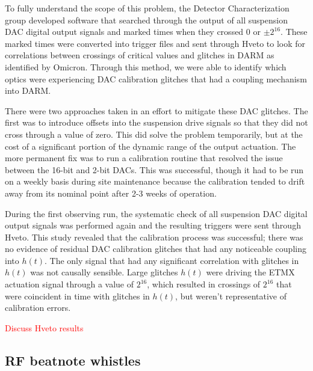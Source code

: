 To fully understand the scope of this problem, the Detector Characterization 
group developed software that searched through the output of all suspension 
DAC digital output signals and marked times when they crossed 0 or $\pm2^{16}$. 
These marked times were converted into trigger files and sent through Hveto 
to look for correlations between crossings of critical values and glitches 
in DARM as identified by Omicron. Through this method, we were able to identify 
which optics were experiencing DAC calibration glitches that had a coupling 
mechanism into DARM.

There were two approaches taken in an effort to mitigate these DAC glitches. The 
first was to introduce offsets into the suspension drive signals so that they 
did not cross through a value of zero. This did solve the problem temporarily, 
but at the cost of a significant portion of the dynamic range of the output 
actuation. The more permanent fix was to run a calibration routine 
that resolved the issue between the 16-bit and 2-bit DACs. This was 
successful, though it had to be run on a weekly basis during site maintenance 
because the calibration tended to drift away from its nominal point after 
2-3 weeks of operation.

During the first observing run, the systematic check of all suspension DAC 
digital output signals was performed again and the resulting triggers were 
sent through Hveto. This study revealed that the calibration process was 
successful; there was no evidence of residual DAC calibration glitches that 
had any noticeable coupling into $h(t)$. The only signal that had any 
significant correlation with glitches in $h(t)$ was not causally sensible. 
Large glitches $h(t)$ were driving the ETMX actuation signal through a value of 
$2^{16}$, which resulted in crossings of $2^{16}$ that were coincident in time 
with glitches in $h(t)$, but weren't representative of calibration errors.

\textcolor{red}{Discuss Hveto results}

\subsection{RF beatnote whistles}

